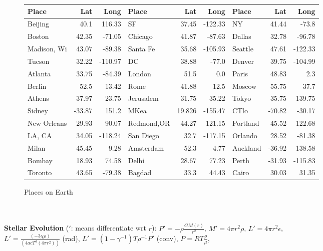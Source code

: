 \begin{figure} [h]
\begin{center}
\begin{tabular} {|lrr|lrr|lrr|}
\hline
{\bf Place} & {\bf Lat} & {\bf Long} & {\bf Place} & {\bf Lat} & {\bf Long} & {\bf Place} & {\bf Lat} & {\bf Long} \\
\hline
Beijing & 40.1 & 116.33 & SF & 37.45 & -122.33 & NY & 41.44 & -73.8 \\
\hline
Boston & 42.35 & -71.05  & Chicago & 41.87 & -87.63 & Dallas & 32.78 & -96.78  \\
\hline
Madison, Wi & 43.07 & -89.38 & Santa Fe & 35.68 & -105.93  & Seattle & 47.61 & -122.33 \\
\hline
Tucson & 32.22 & -110.97  & DC & 38.88 & -77.0 & Denver & 39.75 & -104.99  \\
\hline
Atlanta & 33.75 & -84.39 & London & 51.5 & 0.0 & Paris & 48.83 & 2.3 \\
\hline
Berlin & 52.5 & 13.42  & Rome & 41.88 & 12.5 & Moscow & 55.75 & 37.7 \\
\hline
Athens & 37.97 & 23.75 & Jerusalem & 31.75 & 35.22  & Tokyo & 35.75 & 139.75 \\
\hline
Sidney & -33.87 & 151.2 & MKea & 19.826 & -155.47 & CTlo & -70.82 & -30.17  \\
\hline
New Orleans & 29.93 & -90.07 & Redmond,OR & 44.27 & -121.15 & Portland & 45.52 & -122.68 \\
\hline
LA, CA & 34.05 & -118.24  & San Diego & 32.7 & -117.15 & Orlando & 28.52 & -81.38  \\
\hline
Milan & 45.45 & 9.28 & Amsterdam & 52.3 & 4.77  & Auckland & -36.92 & 138.58 \\
\hline
Bombay & 18.93 & 74.58  & Delhi & 28.67 & 77.23 & Perth & -31.93 & -115.83  \\
\hline
Toronto & 43.65 & -79.38 & Bagdad & 33.3 & 44.43 & Cairo & 30.03 & 31.35 \\
\hline
\end{tabular}
\end{center}
\caption{Places on Earth}
\end{figure}
\\
\\
{\bf Stellar Evolution} ($'$: means differentiate wrt $r$):
$P'= - \rho {\frac {G M(r)} {r^{2}}}$, $M'= 4 \pi r^{2}\rho$,
$L'= 4 \pi r^{2} \epsilon$,\\
$L'= {\frac {(-3 \chi \rho)}  {(4 a c T^{3} (4 \pi r^{2})) }}$ (rad),
$L'= (1 - \gamma^{-1}) T  \rho^{-1} P'$ (conv),
$P=RT {\frac {\rho} {\mu}}$,
